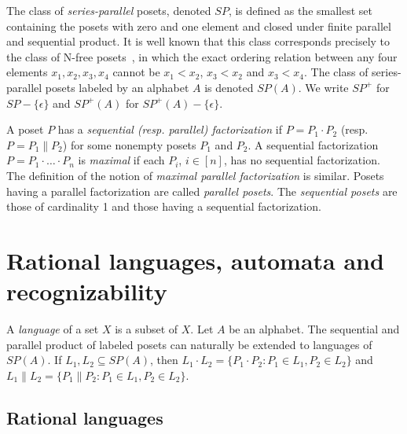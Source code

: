 \documentclass{CSML}
\begin{document}
The class of \emph{series-parallel} posets, denoted $SP$, is defined as the smallest set containing the posets with zero and one element and closed under finite parallel and sequential product. It is well known that this class corresponds precisely to the class of N-free posets~\cite{Val78,VTL82:SPDigraphs}, in which the exact ordering relation between any four elements $x_1, x_2, x_3, x_4$ cannot be $x_1<x_2$, $x_3<x_2$ and $x_3<x_4$. The class of series-parallel posets labeled by an alphabet $A$ is denoted $SP(A)$. We write $SP^+$ for $SP-\{\epsilon\}$ and $SP^+(A)$ for $SP^+(A)-\{\epsilon\}$.

A poset $P$ has a \emph{sequential (resp. parallel) factorization} if $P=P_1\cdot P_2$ (resp. $P=P_1\parallel P_2$) for some nonempty posets $P_1$ and $P_2$. A sequential factorization $P=P_1\cdot\dots\cdot P_n$ is \emph{maximal} if each $P_i$, $i\in[n]$, has no sequential factorization. The definition of the notion of \emph{maximal parallel factorization} is similar. Posets having a parallel factorization are called \emph{parallel posets}. The \emph{sequential posets} are those of cardinality 1 and those having a sequential factorization.

\section{Rational languages, automata and recognizability}
\label{sec:languages}

A \emph{language} of a set $X$ is a subset of $X$.
Let $A$ be an alphabet.
The sequential and parallel product of labeled posets can naturally be extended to languages of $SP(A)$.
If $L_1, L_2\subseteq SP(A)$, then $L_1 \cdot L_2=\{ P_1 \cdot P_2 : P_1\in L_1 , P_2\in L_2 \}$ and $L_1 \parallel L_2= \{ P_1 \parallel P_2 : P_1\in L_1 , P_2\in L_2 \}$.

\subsection{Rational languages}
\end{document}
